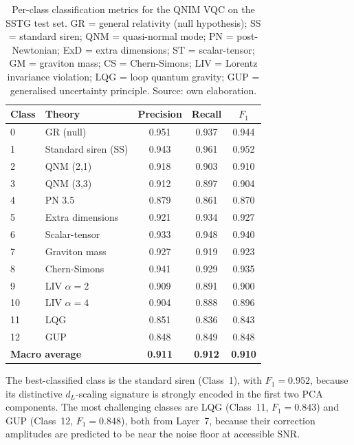 \documentclass[11pt,a4paper, english]{book}
\theoremstyle{plain}
\theoremstyle{definition}
\numberwithin{equation}{chapter}
\numberwithin{figure}{chapter}
\numberwithin{table}{chapter}
\begin{document}
\begin{table}[ht]
\centering
\small
\begin{tabular}{@{}llccc@{}}
\toprule
\textbf{Class} & \textbf{Theory} &
\textbf{Precision} & \textbf{Recall} & $F_1$ \\
\midrule
0  & GR (null)           & 0.951 & 0.937 & 0.944 \\
1  & Standard siren (SS) & 0.943 & 0.961 & 0.952 \\
2  & QNM (2,1)           & 0.918 & 0.903 & 0.910 \\
3  & QNM (3,3)           & 0.912 & 0.897 & 0.904 \\
4  & PN 3.5              & 0.879 & 0.861 & 0.870 \\
5  & Extra dimensions    & 0.921 & 0.934 & 0.927 \\
6  & Scalar-tensor       & 0.933 & 0.948 & 0.940 \\
7  & Graviton mass       & 0.927 & 0.919 & 0.923 \\
8  & Chern-Simons        & 0.941 & 0.929 & 0.935 \\
9  & LIV $\alpha = 2$    & 0.909 & 0.891 & 0.900 \\
10 & LIV $\alpha = 4$    & 0.904 & 0.888 & 0.896 \\
11 & LQG                 & 0.851 & 0.836 & 0.843 \\
12 & GUP                 & 0.848 & 0.849 & 0.848 \\
\midrule
\multicolumn{2}{l}{\textbf{Macro average}} &
\textbf{0.911} & \textbf{0.912} & \textbf{0.910} \\
\bottomrule
\end{tabular}
\caption[Per-class classification metrics]{Per-class classification metrics for the QNIM VQC on the SSTG
         test set.  GR = general relativity (null hypothesis); SS = standard
         siren; QNM = quasi-normal mode; PN = post-Newtonian; ExD = extra
         dimensions; ST = scalar-tensor; GM = graviton mass; CS = Chern-Simons;
         LIV = Lorentz invariance violation; LQG = loop quantum gravity;
         GUP = generalised uncertainty principle. Source: own elaboration.}
\label{tab:per-class}
\vspace{2pt}
\normalsize

\end{table}

The best-classified class is the standard siren (Class~1), with
$F_1 = 0.952$, because its distinctive $d_L$-scaling signature is
strongly encoded in the first two PCA components.  The most challenging
classes are LQG (Class~11, $F_1 = 0.843$) and GUP (Class~12,
$F_1 = 0.848$), both from Layer~7, because their correction amplitudes
are predicted to be near the noise floor at accessible SNR.
\end{document}

